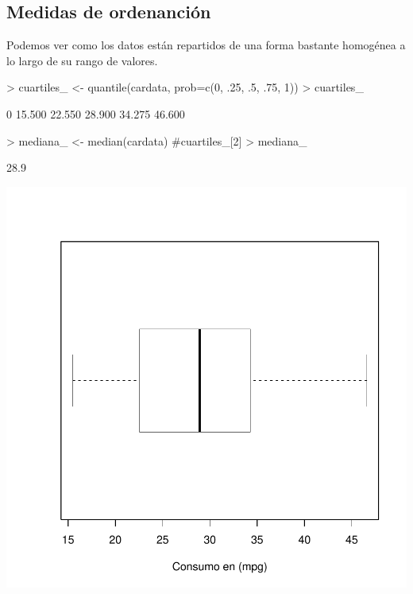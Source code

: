 \documentclass [a4paper] {article}
\begin{document}
\newpage
\subsection{Medidas de ordenanción}
Podemos ver como los datos están repartidos de una forma bastante homogénea a lo largo de su rango de valores.
\begin{Schunk}
\begin{Sinput}
> cuartiles_ <- quantile(cardata, prob=c(0, .25, .5, .75, 1))
> cuartiles_
\end{Sinput}
\begin{Soutput}
    0%
15.500 22.550 28.900 34.275 46.600 
\end{Soutput}
\begin{Sinput}
> mediana_ <- median(cardata) #cuartiles_[2]
> mediana_
\end{Sinput}
\begin{Soutput}
[1] 28.9
\end{Soutput}
\end{Schunk}
\begin{center}
\includegraphics{entrega-ordenacion_cardata_plot}
\end{center}

\newpage
\end{document}
